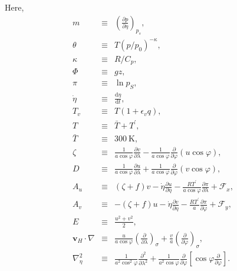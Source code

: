 Here, \begin{eqnarray}
m &\equiv & \left(\frac{\partial p}{\partial \eta}\right)_{p_s}, \\
\theta  &\equiv &  T \left( p/p_{0} \right)^{-\kappa}, \\
\kappa  &\equiv &  R/C_{p}, \\
  \Phi  &\equiv &  gz, \\
   \pi  &\equiv &  \ln p_{S}, \\
 \dot{\eta}  &\equiv &   \frac{\mathrm{d}\eta}{\mathrm{d}t}, \\
     T_v  &\equiv &  T ( 1+\epsilon_v q ), \\
     T  &\equiv &   \bar{T} + T^{\prime}, \\
     \bar{T}&\equiv & 300 \ \mathrm{K}, \\
 \zeta  &\equiv &  \frac{1}{a \cos\varphi }
                    \frac{\partial v}{\partial \lambda}
             -    \frac{1}{a \cos\varphi }
                    \frac{\partial }{\partial \varphi}
                    ( u \cos\varphi ), \\
     D  &\equiv &  \frac{1}{a \cos\varphi }
                    \frac{\partial u}{\partial \lambda}
             +    \frac{1}{a \cos\varphi }
                    \frac{\partial }{\partial \varphi}
                    ( v \cos\varphi ), \\
    A_u  &\equiv &   ( \zeta + f ) v
             - \dot{\eta} \frac{\partial u}{\partial \eta}
             - \frac{RT^{\prime}}{a\cos\varphi}
                  \frac{\partial \pi}{\partial \lambda}
             + {\mathcal F}_x, \\
    A_v  &\equiv &  - ( \zeta + f ) u
             - \dot{\eta} \frac{\partial v}{\partial \eta}
             - \frac{RT^{\prime}}{a}
                  \frac{\partial \pi}{\partial \varphi}
             + {\mathcal F}_y, \\
     E  &\equiv &   \frac{u^{2}+v^{2}}{2}, \\
 {\mathbf{v}}_{H} \cdot \nabla
        &\equiv &  \frac{u}{a \cos \varphi}
         \left( \frac{\partial }{\partial \lambda} \right)_{\sigma}
     + \frac{v}{a}
         \left( \frac{\partial }{\partial \varphi} \right)_{\sigma}, \\
  \nabla^{2}_{\eta}
        &\equiv &
               \frac{1}{a^{2}\cos^2\varphi}
                 \frac{\partial^{2} }{\partial \lambda^{2}}
             + \frac{1}{a^{2}\cos\varphi}
                 \frac{\partial }{\partial \varphi}
                 \left[ \cos\varphi
                       \frac{\partial }{\partial \varphi} \right].  \end{eqnarray}

